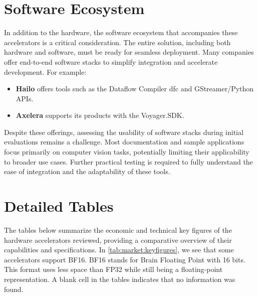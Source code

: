 \section{Software Ecosystem}
In addition to the hardware, the software ecosystem that accompanies these accelerators is a critical consideration.
The entire solution, including both hardware and software, must be ready for seamless deployment.
Many companies offer end-to-end software stacks to simplify integration and accelerate development. For example:

\begin{itemize}
    \item \textbf{Hailo} offers tools such as the Dataflow Compiler \acrshort{dfc} and GStreamer/Python APIs.
    \item \textbf{Axelera} supports its products with the Voyager.SDK.
\end{itemize}

Despite these offerings, assessing the usability of software stacks during initial evaluations remains a challenge.
Most documentation and sample applications focus primarily on computer vision tasks, potentially limiting their applicability to broader use cases.
Further practical testing is required to fully understand the ease of integration and the adaptability of these tools.


\section{Detailed Tables}
The tables below summarize the economic and technical key figures of the hardware accelerators reviewed, providing a comparative overview of their capabilities and specifications.
In \cref{tab:market:keyfigures}, we see that some accelerators support BF16.
BF16 stands for Brain Floating Point with 16 bits. This format uses less space than FP32 while still being a floating-point representation.
A blank cell in the tables indicates that no information was found.

